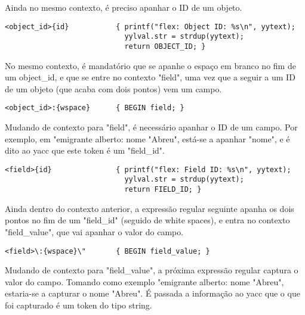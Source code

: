 \documentclass[a4paper]{article}
\begin{document}
\pagebreak
\par Ainda no mesmo contexto, é preciso apanhar o ID de um objeto. 

\lstset{language=tex}
\begin{lstlisting}
<object_id>{id}           { printf("flex: Object ID: %s\n", yytext);               
                            yylval.str = strdup(yytext); 
                            return OBJECT_ID; }
\end{lstlisting}

\bigskip
\par No mesmo contexto, é mandatório que se apanhe o espaço em branco no fim de um object\_id, e que se entre no contexto "field", uma vez que a seguir a um ID de um objeto (que acaba com dois pontos) vem um campo.

\lstset{language=tex}
\begin{lstlisting}
<object_id>:{wspace}      { BEGIN field; }
\end{lstlisting}

\bigskip
\par Mudando de contexto para "field", é necessário apanhar o ID de um campo. Por exemplo, em "emigrante alberto: nome "Abreu", está-se a apanhar "nome", e é dito ao yacc que este token é um "field\_id".

\lstset{language=tex}
\begin{lstlisting}
<field>{id}               { printf("flex: Field ID: %s\n", yytext);                                         
                            yylval.str = strdup(yytext); 
                            return FIELD_ID; }
\end{lstlisting}

\bigskip
\par Ainda dentro do contexto anterior, a expressão regular seguinte apanha os dois pontos no fim de um "field\_id" (seguido de white spaces), e entra no contexto "field\_value", que vai apanhar o valor do campo.

\lstset{language=tex}
\begin{lstlisting}
<field>\:{wspace}\"       { BEGIN field_value; }
\end{lstlisting}


\bigskip
\par Mudando de contexto para "field\_value", a próxima expressão regular captura o valor do campo. Tomando como exemplo "emigrante alberto: nome "Abreu", estaria-se a capturar o nome "Abreu". É passada a informação ao yacc que o que foi capturado é um token do tipo string.
\end{document}
